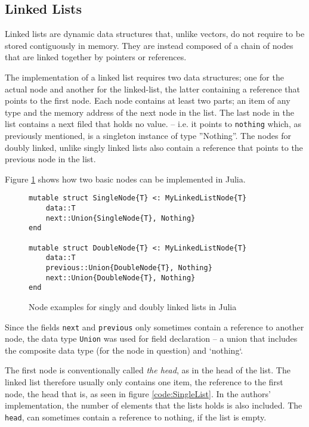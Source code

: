 \documentclass[a4paper, 11pt]{article}
\begin{document}
    \subsection*{Linked Lists}
    Linked lists are dynamic data structures that, unlike vectors, do not require
    to be stored contiguously in memory. They are instead composed of a chain of 
    nodes that are linked together by pointers or references. 
    
    The implementation of a linked list requires two data structures;
    one for the actual node and another for the linked-list, the latter containing a
    reference that points to the first node.
    Each node contains at least two parts; an item of any type and 
    the memory address of the next node in the list. 
    The last node in the list contains a next filed that holds no value.  
    -- i.e. it points to \texttt{nothing} which, as previously mentioned, is a 
    singleton instance of type ''Nothing''. 
    The nodes for doubly linked, unlike singly linked lists
    also contain a reference that points to the previous node in the list.
    
    Figure \ref{code:node} shows how two basic nodes can be implemented in Julia. 
    \begin{figure}[H]
        \centering
    \begin{verbatim}
mutable struct SingleNode{T} <: MyLinkedListNode{T}
    data::T
    next::Union{SingleNode{T}, Nothing}
end

mutable struct DoubleNode{T} <: MyLinkedListNode{T}
    data::T
    previous::Union{DoubleNode{T}, Nothing}
    next::Union{DoubleNode{T}, Nothing}
end
    \end{verbatim}
    \caption{Node examples for singly and doubly linked lists in Julia}
    \label{code:node}
    \end{figure}
    
    Since the fields \texttt{next} and \texttt{previous} only sometimes contain a
    reference to another node, the data type \texttt{Union} was used for field
    declaration -- a union that includes the composite
    data type (for the node in question) and `nothing`.
    
    The first node is conventionally called \emph{the head}, as in the head of the list. 
    The linked list therefore usually only contains one item, the reference to the first node, the 
    head that is, as seen in figure \ref{code:SingleList}. In the authors' implementation, 
    the number of elements that the lists holds is also included. 
    The \texttt{head}, can
    sometimes contain a reference to nothing, if the list is empty. 
    
\end{document}
